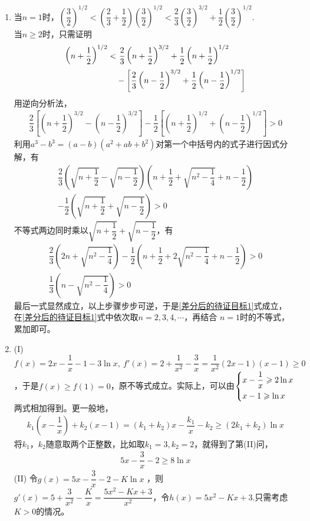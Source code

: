 \begin{enumerate}[label={\textbf{\arabic*.}},leftmargin=
    \inteval{\myenumleftmargin}pt]
\item 当$n=1$时，$\left(\dfrac{3}{2}\right)^{1/2}<\left(
\dfrac{2}{3}+\dfrac{1}{2}\right)\left(\dfrac{3}{2}\right)^{1/2}
<\dfrac{2}{3}\left(\dfrac{3}{2}\right)^{3/2}+\dfrac{1}{2}
\left(\dfrac{3}{2}\right)^{1/2}$. \\
当$n\geq 2$时，只需证明
\begin{align}\label{差分后的待证目标1}
    \left(n+\dfrac{1}{2}\right)^{1/2}
    <&\ \dfrac{2}{3}\left(n+\dfrac{1}{2}\right)^{3/2}+\dfrac{1}{2}
    \left(n+\dfrac{1}{2}\right)^{1/2} \notag \\
    &-\left[\dfrac{2}{3}\left(n-\dfrac{1}{2}\right)^{3/2}+
    \dfrac{1}{2}\left(n-\dfrac{1}{2}\right)^{1/2}\right]  
\end{align}
用逆向分析法，
\begin{gather*}
    \dfrac{2}{3}\left[\left(n+\dfrac{1}{2}\right)^{3/2}-
    \left(n-\dfrac{1}{2}\right)^{3/2}\right]-
    \dfrac{1}{2}\left[\left(n+\dfrac{1}{2}\right)^{1/2}+
    \left(n-\dfrac{1}{2}\right)^{1/2}\right] > 0  
\end{gather*}
利用$a^3-b^3=(a-b)(a^2+ab+b^2)$对第一个中括号内的式子进行因式分解，有
\begin{gather*}
    \dfrac{2}{3}\left(\sqrt{n+\dfrac{1}{2}}-
    \sqrt{n-\dfrac{1}{2}}\right)\left(n+\dfrac{1}{2}+
    \sqrt{n^2-\dfrac{1}{4}}+n-\dfrac{1}{2}\right) \\
    -\dfrac{1}{2}\left(\sqrt{n+\dfrac{1}{2}}+
    \sqrt{n-\dfrac{1}{2}}\right)>0
\end{gather*}
不等式两边同时乘以$ \sqrt{n+\dfrac{1}{2}}+
\sqrt{n-\dfrac{1}{2}} $，有
\begin{gather*}
    \dfrac{2}{3}\left(2n+\sqrt{n^2-\dfrac{1}{4}}\right)
    -\dfrac{1}{2}\left(n+\dfrac{1}{2}+
    2\sqrt{n^2-\dfrac{1}{4}}+n-\dfrac{1}{2}\right)>0 \\
    \dfrac{1}{3}\left(n-\sqrt{n^2-\dfrac{1}{4}}\right)>0
\end{gather*}
最后一式显然成立，以上步骤步步可逆，于是\eqref{差分后的待证目标1}式成立，
在\eqref{差分后的待证目标1}式中依次取$n=2,3,4,\cdots$，再结合
$n=1$时的不等式，累加即可。

\item (I)
$ f(x)=2x-\dfrac{1}{x}-1-3\ln x,\ f'(x)=2+\dfrac{1}{x^2}-\dfrac{3}{x}=\dfrac{1}{x^2}
(2x-1)(x-1)\geq 0 $，于是$ f(x)\geq f(1)=0 $，原不等式成立。实际上，可以由$ \begin{dcases}
    x-\dfrac{1}{x} \geq 2\ln x\\
    x-1 \geq \ln x
\end{dcases}$两式相加得到。更一般地，
\begin{gather*}
    k_1\left(x-\dfrac{1}{x}\right)+k_2(x-1)=(k_1+k_2)x-\dfrac{k_1}{x}-k_2
    \geq (2k_1+k_2)\ln x 
\end{gather*}
将$k_1，k_2 $随意取两个正整数，比如取$ k_1=3,k_2=2 $，就得到了第(II)问，
\begin{gather*}
    5x-\dfrac{3}{x}-2\geq 8\ln x
\end{gather*}
(II) 令$ g(x)=5x-\dfrac{3}{x}-2-K\ln x$ ，则$ g'(x)=5+\dfrac{3}{x^2}-\dfrac{K}{x}=\dfrac{5x^2-Kx+3}{x^2} $，令$ h(x)=5x^2-Kx+3 $.只需考虑$ K>0 $的情况。 


\end{enumerate}
